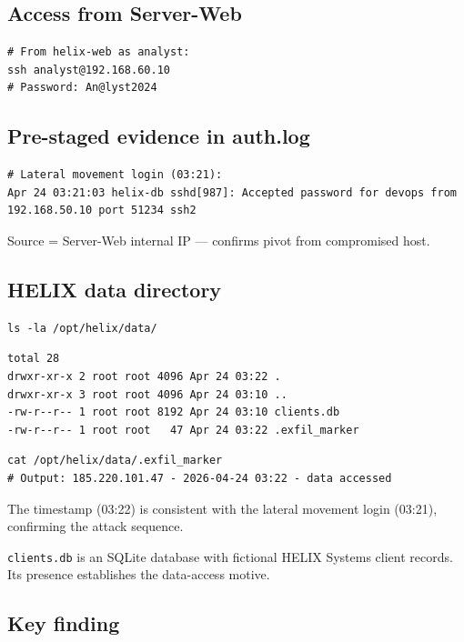 \subsection{Access from Server-Web}

\begin{lstlisting}
# From helix-web as analyst:
ssh analyst@192.168.60.10
# Password: An@lyst2024
\end{lstlisting}

\subsection{Pre-staged evidence in auth.log}

\begin{lstlisting}
# Lateral movement login (03:21):
Apr 24 03:21:03 helix-db sshd[987]: Accepted password for devops from 192.168.50.10 port 51234 ssh2
\end{lstlisting}

Source  = Server-Web internal IP --- confirms pivot from compromised host.

\subsection{HELIX data directory}

\begin{lstlisting}
ls -la /opt/helix/data/
\end{lstlisting}

\begin{lstlisting}
total 28
drwxr-xr-x 2 root root 4096 Apr 24 03:22 .
drwxr-xr-x 3 root root 4096 Apr 24 03:10 ..
-rw-r--r-- 1 root root 8192 Apr 24 03:10 clients.db
-rw-r--r-- 1 root root   47 Apr 24 03:22 .exfil_marker
\end{lstlisting}

\begin{lstlisting}
cat /opt/helix/data/.exfil_marker
# Output: 185.220.101.47 - 2026-04-24 03:22 - data accessed
\end{lstlisting}

The  timestamp (03:22) is consistent with the lateral movement login (03:21), confirming the attack sequence.

\texttt{clients.db} is an SQLite database with fictional HELIX Systems client records. Its presence establishes the data-access motive.

\subsection{Key finding}

